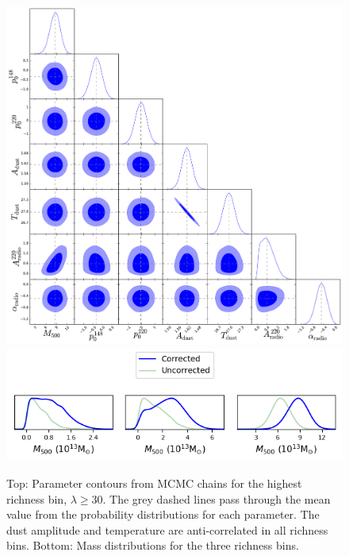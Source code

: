 \documentclass[a4paper,fleqn,usenatbib]{mnras}
\begin{document}
\begin{figure}
  \centering
  \includegraphics[width= \columnwidth] {corner_0190123_nw_18_ns_10000_mbatalpha_tophat_11_arcmin_zbin01_rbin2_v4_sigalpha02_numpy_cut_1000.pdf}
  \includegraphics[width=\columnwidth]{plot_mdists.png}
  
  \caption{Top: Parameter contours from MCMC chains for the highest richness bin, $\lambda \geq 30$. The grey dashed lines pass through the mean value from the probability distributions for each parameter. The dust amplitude and temperature are anti-correlated in all richness bins.
  Bottom: Mass distributions for the three richness bins. }  \label{fig:mcmccontours}
\end{figure}
\end{document}
